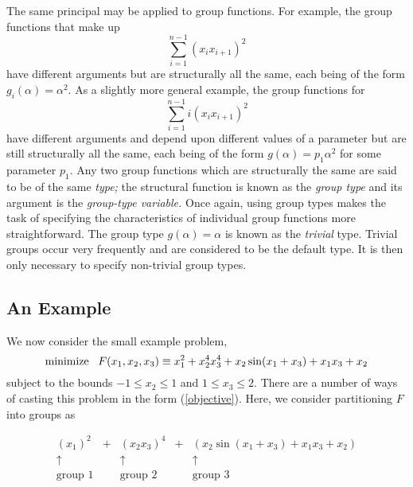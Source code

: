 \documentclass[a4paper]{article}
\newcommand{\beqn}[1]{\begin{equation}\label{#1}}
\newcommand{\eeqn}{\end{equation}}
\newcommand{\req}[1]{(\ref{#1})}
\begin{document}
The same principal may be applied to group functions.
For example, the group functions that make up
\beqn{1.3.4}
\sum_{i = 1}^{n-1} (x_i x_{i + 1})^2
\eeqn
have different arguments but are structurally all the same, each being
of the form $g_i ( \alpha  ) = \alpha^2$.  As a  slightly more general
example, the group functions for
\beqn{1.3.5}
\sum_{i = 1}^{n-1} i(x_i x_{i + 1})^2
\eeqn
have different  arguments and  depend  upon  different  values   of  a
parameter
but are  still structurally all  the same, each being of the
form $g ( \alpha ) = p_1 \alpha^2$ for some  parameter $p_1$.  Any two
group functions which are structurally the same are  said to be of the
same  {\em type;} the  structural function is known  as the {\em group
type}
and its argument is  the {\em group-type variable.}
Once  again,  using group types  makes   the   task of  specifying the
characteristics  of  individual  group functions
more straightforward.
The group  type $g(\alpha ) = \alpha$  is  known as  the {\em trivial}
type.
Trivial groups  occur very frequently and  are considered to be
the default type.
It  is then only  necessary to  specify  non-trivial group types.

\subsection{\label{S1.4}An Example}

We now consider the small example problem,
\[
{\rm minimize} \;\;\; F(x_1, x_2,x_3)
\equiv x_1^2 + x_2^4 x_3^4 + x_2 \sin(x_1 + x_3) + x_1 x_3 + x_2
\]
subject to the bounds
$- 1 \leq x_2 \leq 1$ and $1 \leq x_3 \leq 2$.
There are a number of ways of casting this problem in the
form \req{objective}. Here, we consider partitioning $F$
into groups
as

\[ \begin{array}{ccccc}
(x_1)^2 & + & (x_2 x_3)^4 & + & (x_2 \sin(x_1 + x_3) + x_1 x_3 + x_2) \\
\uparrow  & & \uparrow & & \uparrow \\
\mbox{group 1} & & \mbox{group 2} & & \mbox{group 3}
\end{array} \]
\end{document}
